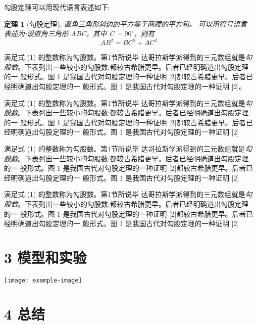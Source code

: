 \documentclass[twocolumn]{ctexart}
\newtheorem{thm}{定理}
\begin{document}
勾股定理可以用现代语言表述如下:


\begin{thm}[勾股定理] 

    直角三角形斜边的平方等于两腰的平方和。
    可以用符号语言表述为:设直角三角形 ABC，其中 \angle C = $90^\circ$，则有
\begin{equation}
    AB^2 = BC^2 + AC^2  
\end{equation}

\end{thm}
满足式 (1) 的整数称为勾股数。第1节所说毕 达哥拉斯学派得到的三元数组就是\emph{勾股数}。下表列出一些较小的勾股数:都较古希腊更早。后者已经明确道出勾股定理的一 般形式。图 1 是我国古代对勾股定理的一种证明 [2]都较古希腊更早。后者已经明确道出勾股定理的一 般形式。图 1 是我国古代对勾股定理的一种证明 [2]。

满足式 (1) 的整数称为勾股数。第1节所说毕 达哥拉斯学派得到的三元数组就是\emph{勾股数}。下表列出一些较小的勾股数:都较古希腊更早。后者已经明确道出勾股定理的一 般形式。图 1 是我国古代对勾股定理的一种证明 [2]都较古希腊更早。后者已经明确道出勾股定理的一 般形式。图 1 是我国古代对勾股定理的一种证明 [2]

满足式 (1) 的整数称为勾股数。第1节所说毕 达哥拉斯学派得到的三元数组就是\emph{勾股数}。下表列出一些较小的勾股数:都较古希腊更早。后者已经明确道出勾股定理的一 般形式。图 1 是我国古代对勾股定理的一种证明 [2]都较古希腊更早。后者已经明确道出勾股定理的一 般形式。图 1 是我国古代对勾股定理的一种证明 [2]

满足式 (1) 的整数称为勾股数。第1节所说毕 达哥拉斯学派得到的三元数组就是\emph{勾股数}。下表列出一些较小的勾股数:都较古希腊更早。后者已经明确道出勾股定理的一 般形式。图 1 是我国古代对勾股定理的一种证明 [2]都较古希腊更早。后者已经明确道出勾股定理的一 般形式。图 1 是我国古代对勾股定理的一种证明 [2]

\section*{3 模型和实验}

\lipsum[2-3]


\begin{strip}
    \centering\texttt{[image: example-image]}
\end{strip}

\lipsum[4-7]
\section*{4 总结}
\lipsum[8]

\end{document}
